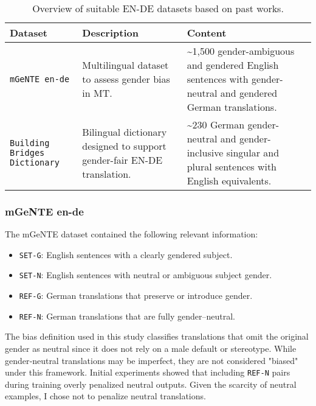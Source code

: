 \begin{table}[ht!]
    \centering
    \renewcommand{\arraystretch}{1.3}
    \begin{tabularx}{\textwidth}{|>{\raggedright\arraybackslash}X|>{\raggedright\arraybackslash}X|>{\raggedright\arraybackslash}X|}
    \hline
    \textbf{Dataset} & \textbf{Description} & \textbf{Content} \\ \hline
    \texttt{mGeNTE en-de} \parencite{savoldiMGeNTEMultilingualResource2025} & Multilingual dataset to assess gender bias in MT. & \textasciitilde1,500 gender-ambiguous and gendered English sentences with gender-neutral and gendered German translations. \\ \hline
    \texttt{Building Bridges Dictionary} \parencite{lardelliBuildingBridgesDataset2024} & Bilingual dictionary designed to support gender-fair EN-DE translation. & \textasciitilde230 German gender-neutral and gender-inclusive singular and plural sentences with English equivalents. \\ \hline
    \end{tabularx}
    \caption{Overview of suitable EN-DE datasets based on past works.}
    \label{tab:available_datasets}
\end{table}

\subsubsection{mGeNTE en-de} The mGeNTE dataset contained the following relevant information:  

\begin{itemize}  
  \item \texttt{SET-G}: English sentences with a clearly gendered subject.  
  \item \texttt{SET-N}: English sentences with neutral or ambiguous subject gender.  
  \item \texttt{REF-G}: German translations that preserve or introduce gender.  
  \item \texttt{REF-N}: German translations that are fully gender–neutral.  
\end{itemize}  

\noindent
The bias definition used in this study classifies translations that omit the original gender as neutral since it does not rely on a male default or stereotype. While gender‑neutral translations may be imperfect, they are not considered "biased" under this framework. Initial experiments showed that including \texttt{REF-N} pairs during training overly penalized neutral outputs. Given the scarcity of neutral examples, I chose not to penalize neutral translations. 

